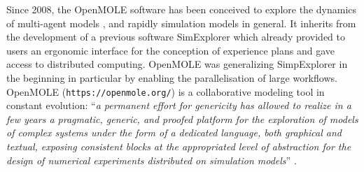 \documentclass[10pt]{article}
\begin{document}
Since 2008, the OpenMOLE software has been conceived to explore the dynamics of multi-agent models \citep{reuillon2010declarative,reuillon2013openmole}, and rapidly simulation models in general. It inherits from the development of a previous software SimExplorer \citep{amblard2003comprendre,deffuant2003demarche} which already provided to users an ergonomic interface for the conception of experience plans and gave access to distributed computing. OpenMOLE was generalizing SimpExplorer in the beginning in particular by enabling the parallelisation of large workflows. OpenMOLE (\texttt{https://openmole.org/}) is a collaborative modeling tool in constant evolution: ``\textit{a permanent effort for genericity has allowed to realize in a few years a pragmatic, generic, and proofed platform for the exploration of models of complex systems under the form of a dedicated language, both graphical and textual, exposing consistent blocks at the appropriated level of abstraction for the design of numerical experiments distributed on simulation models}'' \citep{schmitt2014modelisation}.
\end{document}
